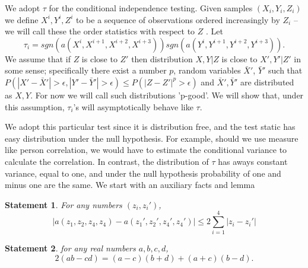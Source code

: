 \documentclass{article}
\newtheorem{definition}{Definition}
\newtheorem{statement}{Statement}
\begin{document}
We adopt $\tau$ for the conditional independence testing. Given samples $(X_i,Y_i,Z_i)$ we define  $X^{i},Y^{i},Z^{i}$ to be a sequence of observations ordered increasingly by $Z_i$ -- we will call these the order statistics with respect to $Z$ . Let
 \[ 
\tau_i = sgn(a(X^{i},X^{i+1},X^{i+2},X^{i+3})) sgn(a(Y^{i},Y^{i+1},Y^{i+2},Y^{i+3})).  
 \]
We assume that if $Z$ is close to $Z'$ then  distribution $X,Y|Z$ is close to  $X',Y'|Z'$ in some sense; specifically  there exist a number $p$,  random variables  $\bar X'$, $\bar Y'$ such that $P( |X'- \bar X'|>\epsilon,|Y'- \bar Y'|>\epsilon  ) \leq P(|Z-Z'|^p>\epsilon)$ and $\bar X', \bar Y'$ are distributed as $X,Y$. For now we will call such distributions 'p-good'. We will show that, under this assumption, $\tau_i$'s will asymptotically behave like $\tau$.   

We adopt this particular test since it is distribution free, and the test static has easy distribution under the null hypothesis. For example, should we use measure like person correlation, we would have to estimate the conditional variance to calculate the correlation. In contrast, the distribution of $\tau$ has aways constant variance, equal to one, and under the null hypothesis probability of one and minus one are the same.  We start with an auxiliary facts and lemma
\begin{statement}
\label{lem:err}
For any numbers $(z_i,z_i')$, 
\[
| a(z_1,z_2,z_4,z_4) -  a(z_1',z_2',z_4',z_4')| \leq 2\sum_{i=1}^4 |z_i-z_i'|
\]
\end{statement}






\begin{statement}
\label{lemma:keyLemma}
 for any real numbers $a,b,c,d$, 
 \[
  2(ab -cd) = (a-c)(b+d) + (a+c)(b-d). 
 \]
\end{statement}

\end{document}
